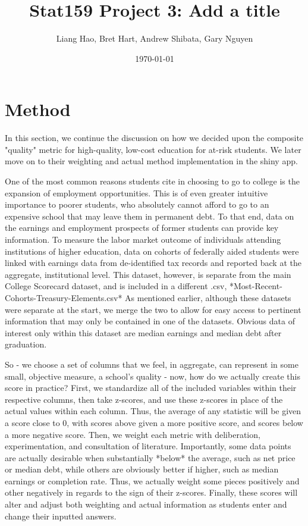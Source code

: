 \documentclass{article}
\title{Stat159 Project 3: Add a title}
\author{Liang Hao, Bret Hart, Andrew Shibata, Gary Nguyen}
\date{\today}
\begin{document}


\maketitle
\section{Method}

In this section, we continue the discussion on how we decided upon the composite "quality" metric for high-quality, low-cost education for at-risk students. We later move on to their weighting and actual method implementation in the shiny app. 

One of the most common reasons students cite in choosing to go to college is the expansion of employment opportunities. This is of even greater intuitive importance to poorer students, who absolutely cannot afford to go to an expensive school that may leave them in permanent debt. To that end, data on the earnings and employment prospects of former students can provide key information. To measure the labor market outcome of individuals attending institutions of higher education, data on cohorts of federally aided students were linked with earnings data from de-identified tax records and reported back at the aggregate, institutional level. This dataset, however, is separate from the main College Scorecard dataset, and is included in a different .csv, *Most-Recent-Cohorts-Treasury-Elements.csv* As mentioned earlier, although these datasets were separate at the start, we merge the two to allow for easy access to pertinent information that may only be contained in one of the datasets. Obvious data of interest only within this dataset are median earnings and median debt after graduation.

So - we choose a set of columns that we feel, in aggregate, can represent in some small, objective measure, a school's quality - now, how do we actually create this score in practice? First, we standardize all of the included variables within their respective columns, then take z-scores, and use these z-scores in place of the actual values within each column. Thus, the average of any statistic will be given a score close to 0, with scores above given a more positive score, and scores below a more negative score. Then, we weight each metric with deliberation, experimentation, and consultation of literature. Importantly, some data points are actually desirable when substantially *below* the average, such as net price or median debt, while others are obviously better if higher, such as median earnings or completion rate. Thus, we actually weight some pieces positively and other negatively in regards to the sign of their z-scores. Finally, these scores will alter and adjust both weighting and actual information as students enter and change their inputted answers. 
\end{document}
